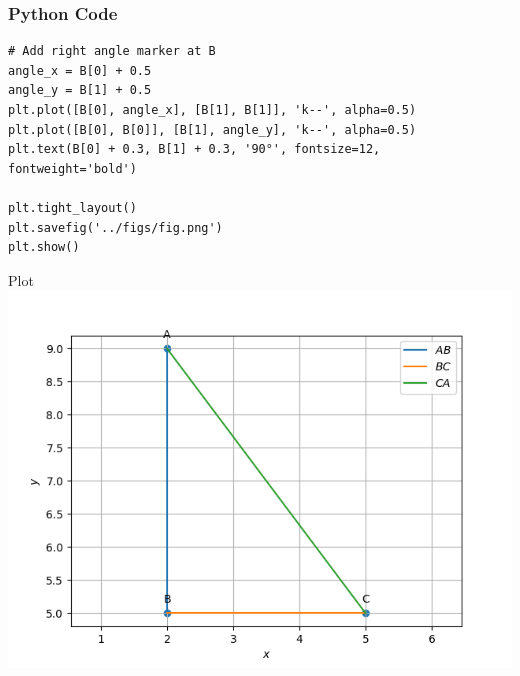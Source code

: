 \documentclass{beamer}
\begin{document}
\begin{frame}[fragile]
    \frametitle{Python Code}
    \begin{lstlisting}
# Add right angle marker at B
angle_x = B[0] + 0.5
angle_y = B[1] + 0.5
plt.plot([B[0], angle_x], [B[1], B[1]], 'k--', alpha=0.5)
plt.plot([B[0], B[0]], [B[1], angle_y], 'k--', alpha=0.5)
plt.text(B[0] + 0.3, B[1] + 0.3, '90°', fontsize=12, fontweight='bold')

plt.tight_layout()
plt.savefig('../figs/fig.png')
plt.show()

    \end{lstlisting}
\end{frame}

\begin{frame}{Plot}
    \centering
    \includegraphics[width=\columnwidth, height=0.8\textheight, keepaspectratio]{figs/fig.png}     
\end{frame}
\end{document}
